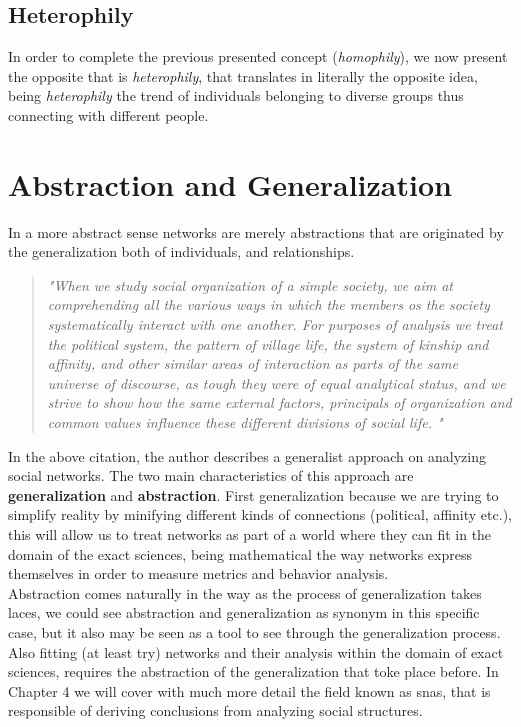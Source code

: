 \subsection*{Heterophily}

In order to complete the previous presented concept (\textit{homophily}), we now present the opposite that is \textit{heterophily}, that translates in literally the opposite idea, being \textit{heterophily} the trend of individuals belonging to diverse groups thus connecting with different people.


\section{Abstraction and Generalization}

In a more abstract sense networks are merely abstractions that are originated by the generalization both of individuals, and relationships.\\

\begin{quote}
\textit{"When we study social organization of a simple society, we aim at comprehending all the various ways in which the members os the society systematically interact with one another. For purposes of analysis we treat the political system, the pattern of village life, the system of kinship and affinity, and other similar areas of interaction as parts of the same universe of discourse, as tough they were of equal analytical status, and we strive to show how the same external factors, principals of organization and common values influence these different divisions of social life.
"}
\cite{barnes1954class}
\end{quote}

\indent In the above citation, the author describes a generalist approach on analyzing social networks. The two main characteristics of this approach are \textbf{generalization} and \textbf{abstraction}. First generalization because we are trying to simplify reality by minifying different kinds of connections (political, affinity etc.), this will allow us to treat networks as part of a world where they can fit in the domain of the exact sciences, being mathematical the way networks express themselves in order to measure metrics and behavior analysis.\\
\indent Abstraction comes naturally in the way as the process of generalization takes laces, we could see abstraction and generalization as synonym in this specific case, but it also may be seen as a tool to see through the generalization process. Also fitting (at least try) networks and their analysis within the domain of exact sciences, requires the abstraction of the generalization that toke place before. In Chapter 4 we will cover with much more detail the field known as \glspl{sna}, that is responsible of deriving conclusions from analyzing social structures.
